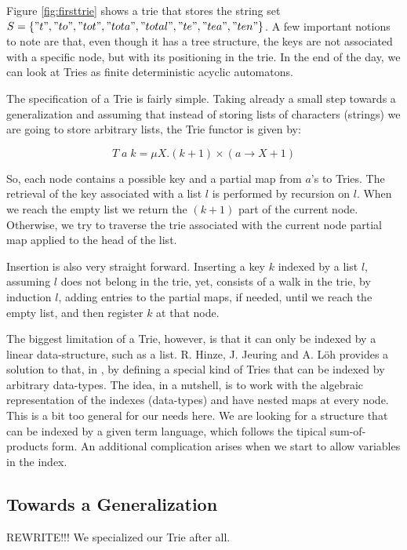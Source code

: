 Figure \ref{fig:firsttrie} shows a trie that stores the string set 
$S = \{ "t" , "to" , "tot" , "tota" , "total" , "te" , "tea" , "ten" \}$.
A few important notions to note are that, even though it has a tree structure, the keys are
not associated with a specific node, but with its positioning in the trie.
In the end of the day, we can look at Tries as finite deterministic acyclic automatons.

The specification of a Trie is fairly simple. Taking already a small step towards a generalization
and assuming that instead of storing lists of characters (strings) we are going to store arbitrary
lists, the Trie functor is given by:

\[
  T\;a\;k = \mu X . (k + 1) \times (a \rightarrow X + 1)
\]

So, each node contains a possible key and a partial map from $a$'s to Tries. The retrieval of
the key associated with a list $l$ is performed by recursion on $l$. When we reach the empty list
we return the $(k+1)$ part of the current node. Otherwise, we try to traverse the trie associated with the
current node partial map applied to the head of the list. 

Insertion is also very straight forward. Inserting a key $k$ indexed by a list $l$, assuming $l$ does not belong
in the trie, yet, consists of a walk in the trie, by induction $l$, adding entries to the partial maps, if needed,
until we reach the empty list, and then register $k$ at that node.

The biggest limitation of a Trie, however, is that it can only be indexed by a linear data-structure, 
such as a list. R. Hinze, J. Jeuring and A. L\"{o}h provides a solution to that, in \cite{Hinze04}, 
by defining a special kind of Tries that can be indexed by arbitrary data-types. The idea, in a nutshell,
is to work with the algebraic representation of the indexes (data-types) and have nested maps at every node.
This is a bit too general for our needs here. We are looking for a structure that can be indexed
by a given term language, which follows the tipical sum-of-products form. An additional complication
arises when we start to allow variables in the index.

\subsection{Towards a Generalization}

\begin{TODO}
  \item REWRITE!!! We specialized our Trie after all.
\end{TODO}

